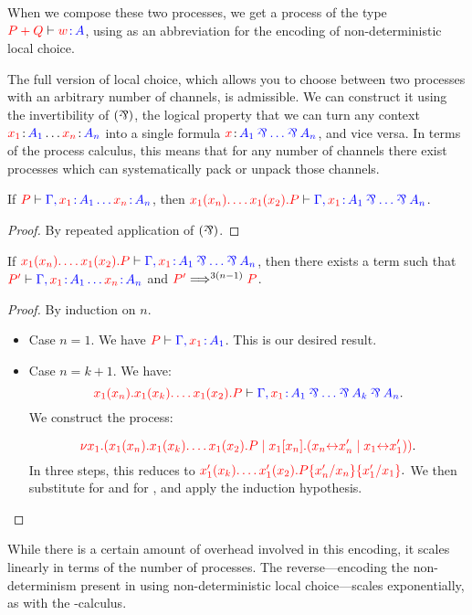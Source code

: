 When we compose these two processes, we get a process of the type
$\seq[{ P + Q}]{ \tmty{w}{A} }$, using  as an abbreviation for the
encoding of non-deterministic local choice.

The full version of local choice, which allows you to choose between two
processes with an arbitrary number of channels, is admissible.
We can construct it using the invertibility of $(\parr)$, the logical property
that we can turn any context $\tmty{x_1}{A_1}\dots\tmty{x_n}{A_n}$ into a single
formula $\tmty{x}{A_1 \parr \dots \parr A_n}$, and vice versa.
In terms of the process calculus, this means that for any number of channels
there exist processes which can systematically pack or unpack those channels.
\begin{lemmaB}
  If $\seq[{ P }]{ \Gamma, \tmty{x_1}{A_1}\dots\tmty{x_n}{A_n} }$, then
  $\seq[{ \cpRecv{x_1}{x_n}{\dots\cpRecv{x_1}{x_2}{P}} }]{
    \Gamma, \tmty{x_1}{A_1 \parr \dots \parr A_n} }$.
\end{lemmaB}
\begin{proof}
  By repeated application of $(\parr)$.
\end{proof}

\begin{lemmaB}
  If $\seq[{ \cpRecv{x_1}{x_n}{\dots\cpRecv{x_1}{x_2}{P}} }]{
    \Gamma, \tmty{x_1}{A_1 \parr \dots \parr A_n} }$, then there exists a term
   such that
  $\seq[{ P' }]{ \Gamma, \tmty{x_1}{A_1}\dots\tmty{x_n}{A_n}}$
  and $\tm{P'} \Longrightarrow^{3(n-1)} \tm{P}$.
\end{lemmaB}
\begin{proof}
  By induction on $n$.
  \begin{itemize}
  \item
    Case $n = 1$.
    We have $\seq[{ P }]{ \Gamma, \tmty{x_1}{A_1} }$.
    This is our desired result.
  \item
    Case $n = k + 1$. We have:
    \[
      \seq[{
      \cpRecv{x_1}{x_n}{\cpRecv{x_1}{x_k}{\dots\cpRecv{x_1}{x_2}{P}}} }]{
      \Gamma, \tmty{x_1}{A_1 \parr \dots \parr A_k \parr A_n} }.
    \]
    We construct the process:

    \[
      \tm{\cpCut{x_1}{
          \cpRecv{x_1}{x_n}{\cpRecv{x_1}{x_k}{\dots\cpRecv{x_1}{x_2}{P}}}}{
          \cpSend{x_1}{x_n}{\cpLink{x_n}{x_n'}}{\cpLink{x_1}{x_1'}}
        }}.
    \]
    In three steps, this reduces to
    \(
      \tm{\cpRecv{x_1'}{x_k}{\dots\cpRecv{x_1'}{x_2}{\cpSub{x_1'}{x_1}{\cpSub{x_n'}{x_n}{P}}}}}.
    \)
    We then substitute  for  and  for , and
    apply the induction hypothesis.
  \end{itemize}
\end{proof}
While there is a certain amount of overhead involved in this encoding, it scales
linearly in terms of the number of processes.
The reverse---encoding the non-determinism present in \nodcap using
non-deterministic local choice---scales exponentially, as with the \textpi-calculus.
